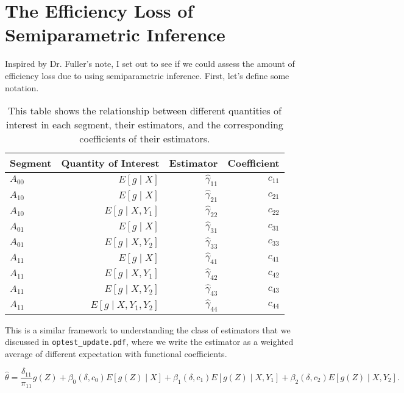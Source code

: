 \documentclass[12pt]{article}
\begin{document}
\rhead{\today}

\section*{The Efficiency Loss of Semiparametric Inference}

Inspired by Dr. Fuller's note, I set out to see if we could assess the amount 
of efficiency loss due to using semiparametric inference. First, let's define 
some notation.

\begin{table}[ht!]
\centering
\begin{tabular}{lrrr}
  \toprule
  Segment & Quantity of Interest & Estimator & Coefficient \\
  \midrule
  $A_{00}$ & $E[g \mid X]$ & $\hat \gamma_{11}$ & $c_{11}$ \\
  $A_{10}$ & $E[g \mid X]$ & $\hat \gamma_{21}$ & $c_{21}$ \\
  $A_{10}$ & $E[g \mid X, Y_1]$ & $\hat \gamma_{22}$ & $c_{22}$ \\
  $A_{01}$ & $E[g \mid X]$ & $\hat \gamma_{31}$ & $c_{31}$ \\
  $A_{01}$ & $E[g \mid X, Y_2]$ & $\hat \gamma_{33}$ & $c_{33}$ \\
  $A_{11}$ & $E[g \mid X]$ & $\hat \gamma_{41}$ & $c_{41}$ \\
  $A_{11}$ & $E[g \mid X, Y_1]$ & $\hat \gamma_{42}$ & $c_{42}$ \\
  $A_{11}$ & $E[g \mid X, Y_2]$ & $\hat \gamma_{43}$ & $c_{43}$ \\
  $A_{11}$ & $E[g \mid X, Y_1, Y_2]$ & $\hat \gamma_{44}$ & $c_{44}$ \\
  \bottomrule
\end{tabular}
\caption{This table shows the relationship between different quantities of
interest in each segment, their estimators, and the corresponding coefficients
of their estimators.}
\label{tab:reftab}
\end{table}

This is a similar framework to understanding the class of estimators 
that we discussed in \verb|optest_update.pdf|, where we write the estimator 
as a weighted average of different expectation with functional coefficients.

\[\hat \theta = \frac{\delta_{11}}{\pi_{11}}g(Z) + \beta_0(\delta, c_0)E[g(Z)
\mid X] + \beta_1(\delta, c_1)E[g(Z) \mid X, Y_1] + \beta_2(\delta, c_2) E[g(Z)
\mid X, Y_2].\]
\end{document}
